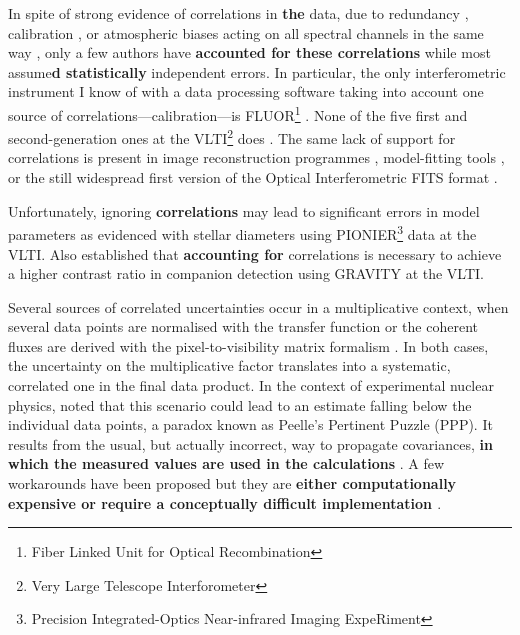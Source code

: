 \documentclass{pasa}
\def\correction#1{{\bfseries #1}}
\begin{document}
In spite of strong evidence of correlations in \correction{the} data, due to redundancy \citep[][in the case of closure phases]{MON07}, calibration \citep{PER03}, or atmospheric biases acting on all spectral channels in the same way \citep{LAW00}, only a few authors \citep{PER04,ABS06,BER06,LAC19,KAM20} have \correction{accounted for these correlations} while most assume\correction{d statistically} independent errors.  In particular, the only interferometric instrument I know of with a data processing software taking into account one source of correlations---calibration---is FLUOR\footnote{Fiber Linked Unit for Optical Recombination} \citep[at IOTA\footnote{Infrared and Optical Telescope Array}, then CHARA\footnote{Center for High Angular Resolution Array}, ][]{PER04}. None of the five first and second-generation ones at the VLTI\footnote{Very Large Telescope Interforometer} does \citep{AMBER,MIDI,PIONIER,GRAVITYpipe,MATISSEpipe}.  The same lack of support for correlations is present in image reconstruction programmes \citep[e.g. MIRA, see][]{THI08}, model-fitting tools \citep[e.g. Litpro, see][]{TAL08}, or the still widespread first version of the Optical Interferometric FITS format \citep[OIFITS v. 1,][]{OIFITS1}.

Unfortunately, ignoring \correction{correlations} may lead to significant errors in model parameters as \citet{LAC19} evidenced with stellar diameters using PIONIER\footnote{Precision Integrated-Optics Near-infrared Imaging ExpeRiment} \citep{PIONIER} data at the VLTI. Also \citet{KAM20} established that \correction{accounting for} correlations is necessary to achieve a higher contrast ratio in companion detection using GRAVITY \citep{GRAVITY} at the VLTI. 

Several sources of correlated uncertainties occur in a multiplicative context, when several data points are normalised with the transfer function \citep{PER03} or the coherent fluxes are derived with the pixel-to-visibility matrix formalism \citep{TAT07}.  In both cases, the uncertainty on the multiplicative factor translates into a systematic, correlated one in the final data product. In the context of experimental nuclear physics, \citet{PEE87} noted that this scenario could lead to an estimate falling below the individual data points, a paradox known as Peelle's Pertinent Puzzle (PPP). It results from the usual, but actually incorrect, way to propagate covariances, \correction{in which the measured values are used in the calculations} \citep{DAG94,NEU12}.  A few workarounds have been proposed but they are \correction{either computationally expensive \citep[e.g. sampling of the posterior probability distribution for Bayesian analysis, see][]{NEU12} or require a conceptually difficult implementation \citep{BEC12,NIS14}}.  
\end{document}
